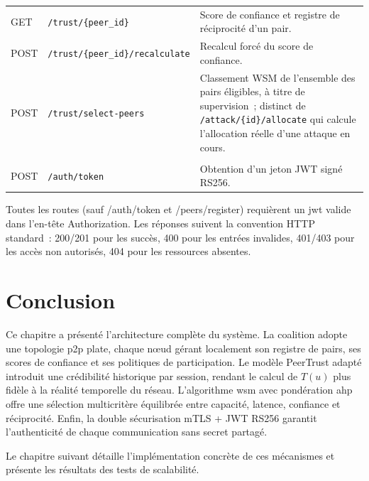 \begin{table}[H]
\begin{tabular}{|
>{\raggedright\arraybackslash}p{2.0cm}|
>{\raggedright\arraybackslash}p{6.0cm}|
>{\raggedright\arraybackslash}p{7.0cm}|}
\multicolumn{3}{|l|}{\textit{Confiance et sélection}} \\
\hline

GET &
\texttt{/trust/\{peer\_id\}} &
Score de confiance et registre de réciprocité d'un pair. \\
\hline

POST &
\texttt{/trust/\{peer\_id\}/recalculate} &
Recalcul forcé du score de confiance. \\
\hline

POST &
\texttt{/trust/select-peers} &
Classement WSM de l'ensemble des pairs éligibles, à titre de supervision~; distinct de \texttt{/attack/\{id\}/allocate} qui calcule l'allocation réelle d'une attaque en cours. \\
\hline

\multicolumn{3}{|l|}{\textit{Sécurité}} \\
\hline

POST &
\texttt{/auth/token} &
Obtention d'un jeton JWT signé RS256. \\
\hline

\end{tabular}

\end{table}

Toutes les routes (sauf {/auth/token} et {/peers/register}) requièrent un \gls{jwt} valide dans l'en-tête {Authorization}. Les réponses suivent la convention HTTP standard~: {200}/{201} pour les succès, {400} pour les entrées invalides, {401}/{403} pour les accès non autorisés, {404} pour les ressources absentes.

\section{Conclusion}

Ce chapitre a présenté l'architecture complète du système. La coalition adopte une topologie \gls{p2p} plate, chaque nœud gérant localement son registre de pairs, ses scores de confiance et ses politiques de participation. Le modèle PeerTrust adapté introduit une crédibilité historique par session, rendant le calcul de $T(u)$ plus fidèle à la réalité temporelle du réseau. L'algorithme \gls{wsm} avec pondération \gls{ahp} offre une sélection multicritère équilibrée entre capacité, latence, confiance et réciprocité. Enfin, la double sécurisation mTLS + JWT RS256 garantit l'authenticité de chaque communication sans secret partagé.

Le chapitre suivant détaille l'implémentation concrète de ces mécanismes et présente les résultats des tests de scalabilité.
